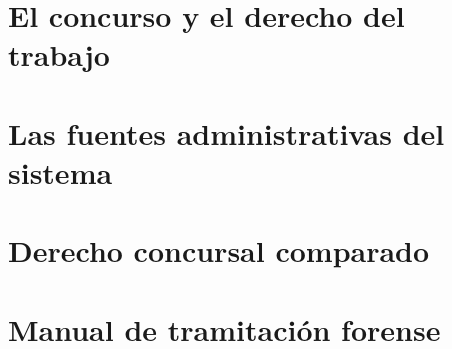 \documentclass[11pt,a4paper,twoside,openright,extrafontsizes]{memoir}
\begin{document}
\part{El concurso y el derecho del trabajo}



\part{Las fuentes administrativas del sistema}



\part{Derecho concursal comparado}





\part{Manual de tramitación forense}








\appendix




\backmatter
\printbibliography[heading=bibintoc,title={Bibliografía y fuentes citadas}]

\cleardoublepage
\printindex[leyes]
\cleardoublepage
\printindex[juris]
\cleardoublepage
\printindex[analitico]
\end{document}
